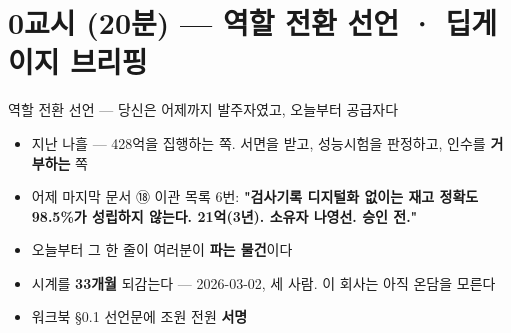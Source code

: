 \section{0교시 (20분) — 역할 전환 선언 · 딥게이지 브리핑}
\begin{frame}{역할 전환 선언 — 당신은 어제까지 발주자였고, 오늘부터 공급자다}
\begin{itemize}
\item 지난 나흘 — 428억을 집행하는 쪽. 서면을 받고, 성능시험을 판정하고, 인수를 \textbf{거부하는} 쪽
\item 어제 마지막 문서 ⑱ 이관 목록 6번: \textbf{"검사기록 디지털화 없이는 재고 정확도 98.5\%가 성립하지 않는다. 21억(3년). 소유자 나영선. 승인 전."}
\item 오늘부터 그 한 줄이 여러분이 \textbf{파는 물건}이다
\item 시계를 \textbf{33개월} 되감는다 — 2026-03-02, 세 사람. 이 회사는 아직 온담을 모른다
\item 워크북 §0.1 선언문에 조원 전원 \textbf{서명}
\end{itemize}
\end{frame}

